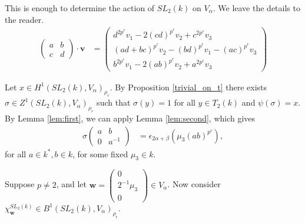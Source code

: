 This is enough to determine the action of $SL_2(k)$ on $V_\alpha$. We leave the details to the reader.
\begin{align*}
\left(\begin{matrix}a & b \\ c & d\end{matrix}\right) \cdot \mathbf{v} 
&= \left(\begin{matrix}
	d^{2p^r}v_1 - 2(cd)^{p^r}v_2 + c^{2p^r}v_3 \\
	(ad + bc)^{p^r}v_2 - (bd)^{p^r}v_1 - (ac)^{p^r}v_3 \\
	b^{2p^r}v_1 - 2(ab)^{p^r}v_2 + a^{2p^r}v_3
\end{matrix}\right)
\end{align*}

Let $x\in H^1(SL_2(k), V_\alpha)_{\rho_r}$. By Proposition \ref{trivial_on_t} there exists $\sigma\in Z^1(SL_2(k), V_\alpha)_{\rho_r}$ such that $\sigma(y) = 1$ for all $y\in T_2(k)$ and $\psi(\sigma) = x$. By Lemma \ref{lem:first}, we can apply Lemma \ref{lem:second}, which gives
\begin{align*}
	\sigma\left(\begin{matrix}a & b\\0 & a^{-1}\end{matrix}\right) &= \epsilon_{2\alpha+\beta}\left(\mu_3(ab)^{p^r}\right),
\end{align*}
for all $a\in k^*, b\in k$, for some fixed $\mu_3\in k$.

Suppose $p\neq 2$, and let $\mathbf{w} = \left(\begin{matrix}0\\2^{-1}\mu_3\\0\end{matrix}\right)\in V_\alpha$. Now consider $\chi^{SL_2(k)}_\mathbf{w} \in B^1(SL_2(k), V_\alpha)_{\rho_r}$.

